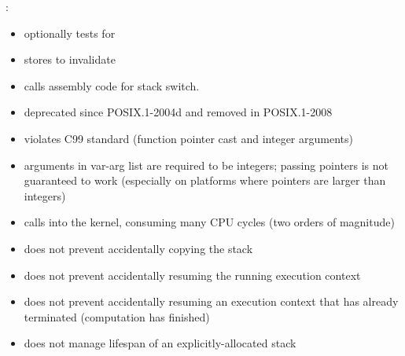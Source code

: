 \contresume:
\begin{itemize}
    \item optionally tests for 
    \item stores  to invalidate 
    \item calls assembly code for stack switch.
\end{itemize}


\begin{itemize}
    \item deprecated since POSIX.1-2004d and removed in POSIX.1-2008
    \item {} violates C99 standard (function pointer cast and integer arguments)
    \item {} arguments in var-arg list are required to be integers; passing pointers
        is not guaranteed to work (especially on platforms where pointers are larger than integers)
    \item {} calls into the kernel, consuming many CPU cycles (two orders
        of magnitude)
    \item does not prevent accidentally copying the stack
    \item does not prevent accidentally resuming the running execution
        context
    \item does not prevent accidentally resuming an execution context that has already
        terminated (computation has finished)
    \item does not manage lifespan of an explicitly-allocated stack
\end{itemize}
